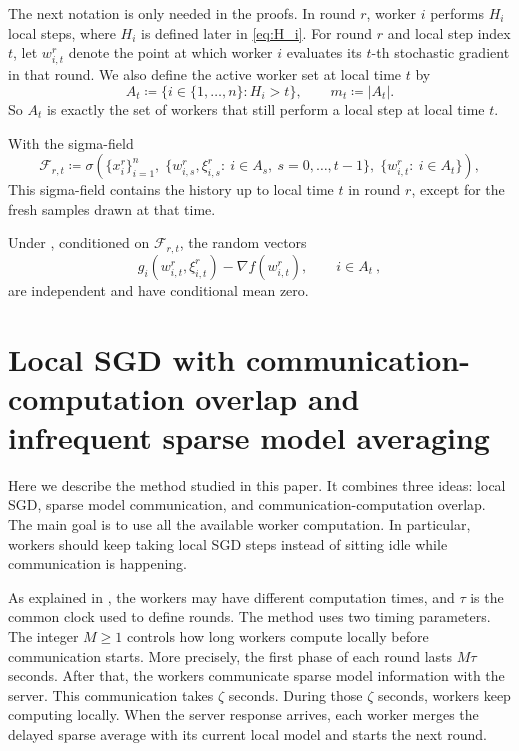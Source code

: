 \documentclass{article}
\newcommand{\cF}{\mathcal{F}}
\newcommand{\eqdef}{\coloneqq}
\newcommand{\arto}[1]{\todo[inline,bordercolor=pastelblue,backgroundcolor=pastelblue!20,linecolor=pastelblue]{\textbf{Arto: }#1}}
\theoremstyle{plain}
\newtheorem{assumption}{Assumption}\numberwithin{assumption}{section}
\theoremstyle{definition}
\begin{document}
The next notation is only needed in the proofs.
In round \(r\), worker \(i\) performs \(H_i\) local steps, where \(H_i\) is defined later in \eqref{eq:H_i}.
For round \(r\) and local step index \(t\), let \(w_{i,t}^r\) denote the point at which worker \(i\) evaluates its \(t\)-th stochastic gradient in that round.
We also define the active worker set at local time \(t\) by
\begin{equation}\label{eq:A_t-89yf908df}%
    A_t \eqdef \{i\in\{1,\dots,n\}: H_i>t\},
    \qquad
    m_t \eqdef |A_t|.
\end{equation}
So \(A_t\) is exactly the set of workers that still perform a local step at local time \(t\).

With the sigma-field
\[%
    \cF_{r,t}
    \eqdef
    \sigma\!\left(
    \{x_i^r\}_{i=1}^n,\;
    \{w_{i,s}^r,\xi_{i,s}^r:\ i\in A_s,\ s=0,\dots,t-1\},\;
    \{w_{i,t}^r:\ i\in A_t\}
    \right) ,
\]
This sigma-field contains the history up to local time \(t\) in round \(r\), except for the fresh samples drawn at that time.

% 
Under , conditioned on \(\cF_{r,t}\), the random vectors
\[%
    g_i(w_{i,t}^r,\xi_{i,t}^r)-\nabla f(w_{i,t}^r),
    \qquad i\in A_t ~,
\]
are independent and have conditional mean zero.
% 
% 
\section{Local SGD with communication-computation overlap and infrequent sparse model averaging}\label{sec:method}
% 
Here we describe the method studied in this paper.
It combines three ideas:
local SGD, sparse model communication, and communication-computation overlap.
The main goal is to use all the available worker computation.
In particular, workers should keep taking local SGD steps instead of sitting idle while communication is happening.

As explained in , the workers may have different computation times, and \(\tau\) is the common clock used to define rounds.
The method uses two timing parameters.
The integer \(M \ge 1\) controls how long workers compute locally before communication starts.
More precisely, the first phase of each round lasts \(M\tau\) seconds.
After that, the workers communicate sparse model information with the server.
This communication takes \(\zeta\) seconds.
During those \(\zeta\) seconds, workers keep computing locally.
When the server response arrives, each worker merges the delayed sparse average with its current local model and starts the next round.
\end{document}
